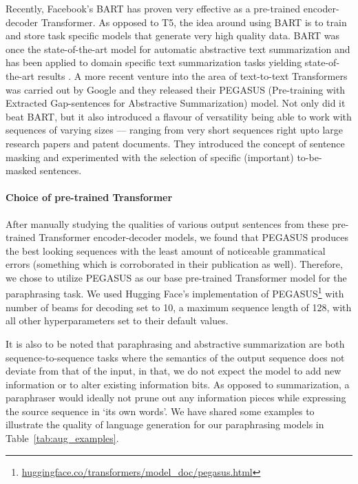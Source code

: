 \documentclass[11pt,a4paper]{article}
\begin{document}
Recently, Facebook's BART \cite{bart} has proven very effective as a pre-trained encoder-decoder Transformer. As opposed to T5, the idea around using BART is to train and store task specific models that generate very high quality data. BART was once the state-of-the-art model for automatic abstractive text summarization and has been applied to domain specific text summarization tasks yielding state-of-the-art results \cite{summaformers}. A more recent venture into the area of text-to-text Transformers was carried out by Google and they released their PEGASUS (Pre-training with Extracted Gap-sentences for Abstractive Summarization) \cite{pegasus} model. Not only did it beat BART, but it also introduced a flavour of versatility being able to work with sequences of varying sizes — ranging from very short sequences right upto large research papers and patent documents. They introduced the concept of sentence masking and experimented with the selection of specific (important) to-be-masked sentences.

\paragraph{Choice of pre-trained Transformer \vspace{0.18cm}\\}
After manually studying the qualities of various output sentences from these pre-trained Transformer encoder-decoder models, we found that PEGASUS produces the best looking sequences with the least amount of noticeable grammatical errors (something which is corroborated in their publication as well). Therefore, we chose to utilize PEGASUS as our base pre-trained Transformer model for the paraphrasing task. We used Hugging Face's implementation of PEGASUS\footnote{\url{huggingface.co/transformers/model_doc/pegasus.html}} with number of beams for decoding set to 10, a maximum sequence length of 128, with all other hyperparameters set to their default values.

It is also to be noted that paraphrasing and abstractive summarization are both sequence-to-sequence tasks where the semantics of the output sequence does not deviate from that of the input, in that, we do not expect the model to add new information or to alter existing information bits. As opposed to summarization, a paraphraser would ideally not prune out any information pieces while expressing the source sequence in `its own words'. We have shared some examples to illustrate the quality of language generation for our paraphrasing models in Table~\ref{tab:aug_examples}.
\end{document}

